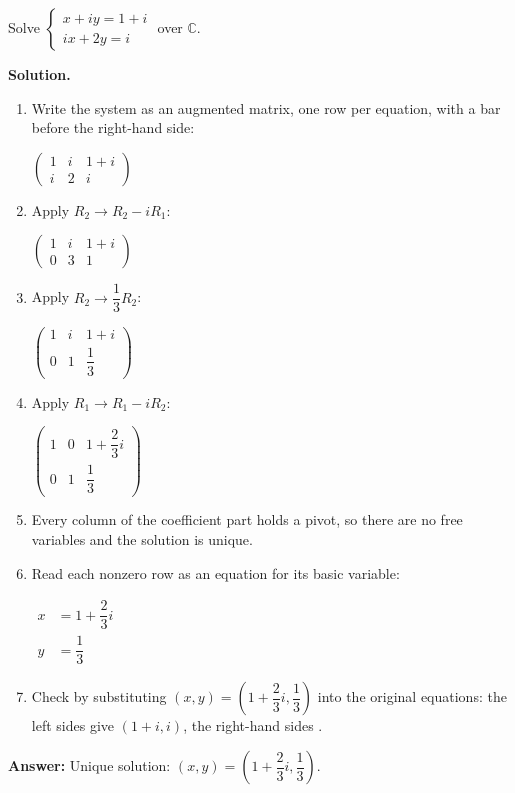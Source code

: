 \documentclass[11pt]{article}
\begin{document}
\begin{tcolorbox}[breakable,colback=white,colframe=ink!60,title={\bfseries Example 7 \textperiodcentered\ A system over $\mathbb{C}$}]Solve $\begin{cases}x+iy=1+i\\ ix+2y=i\end{cases}$ over $\mathbb{C}$.
\par\smallskip
\textbf{Solution.} \begin{enumerate}[leftmargin=1.6em,itemsep=1pt,topsep=2pt,label=\arabic*.]\item Write the system as an augmented matrix, one row per equation, with a bar before the right-hand side:\par\smallskip $\displaystyle \left(\begin{array}{cc|c}1 & i & 1+i \\ i & 2 & i\end{array}\right)$
\item Apply $R_2\to R_2-iR_1$:\par\smallskip $\displaystyle \left(\begin{array}{cc|c}1 & i & 1+i \\ 0 & 3 & 1\end{array}\right)$
\item Apply $R_2\to \dfrac{1}{3} R_2$:\par\smallskip $\displaystyle \left(\begin{array}{cc|c}1 & i & 1+i \\ 0 & 1 & \dfrac{1}{3}\end{array}\right)$
\item Apply $R_1\to R_1-iR_2$:\par\smallskip $\displaystyle \left(\begin{array}{cc|c}1 & 0 & 1+\dfrac{2}{3}i \\ 0 & 1 & \dfrac{1}{3}\end{array}\right)$
\item Every column of the coefficient part holds a pivot, so there are no free variables and the solution is unique.
\item Read each nonzero row as an equation for its basic variable:\par\smallskip $\displaystyle\begin{aligned}x&=1+\dfrac{2}{3}i\\ y&=\dfrac{1}{3}\end{aligned}$
\item Check by substituting $(x,y)=(1+\dfrac{2}{3}i,\dfrac{1}{3})$ into the original equations: the left sides give $(1+i,i)$, the right-hand sides \checkmark.
\end{enumerate}\textbf{Answer:} Unique solution: $(x,y)=(1+\dfrac{2}{3}i,\dfrac{1}{3})$.
\end{tcolorbox}
\end{document}
